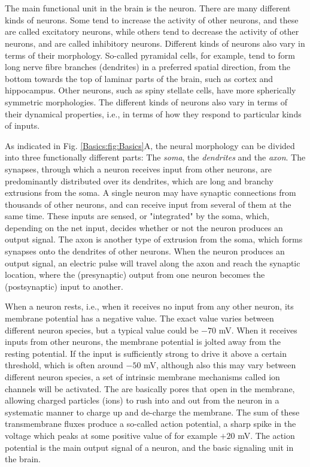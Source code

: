 \section{}
The main functional unit in the brain is the neuron. There are many different kinds of neurons. Some tend to increase the activity of other neurons, and these are called excitatory neurons, while others tend to decrease the activity of other neurons, and are called inhibitory neurons. Different kinds of neurons also vary in terms of their morphology. So-called pyramidal cells, for example, tend to form long nerve fibre branches (dendrites) in a preferred spatial direction, from the bottom towards the top of laminar parts of the brain, such as cortex and hippocampus. Other neurons, such as spiny stellate cells, have more spherically symmetric morphologies. The different kinds of neurons also vary in terms of their dynamical properties, i.e., in terms of how they respond to particular kinds of inputs.

As indicated in Fig. \ref{Basics:fig:Basics}A, the neural morphology can be divided into three functionally different parts: The \textit{soma}, the \textit{dendrites} and the \textit{axon}. The synapses, through which a neuron receives input from other neurons, are predominantly distributed over its dendrites, which are long and branchy extrusions from the soma. A single neuron may have synaptic connections from thousands of other neurons, and can receive input from several of them at the same time. These inputs are sensed, or "integrated" by the soma, which, depending on the net input, decides whether or not the neuron produces an output signal. The axon is another type of extrusion from the soma, which forms synapses onto the dendrites of other neurons. When the neuron produces an output signal, an electric pulse will travel along the axon and reach the synaptic location, where the (presynaptic) output from one neuron becomes the (postsynaptic) input to another.

When a neuron rests, i.e., when it receives no input from any other neuron, its membrane potential has a negative value. The exact value varies between different neuron species, but a typical value could be $-70$ mV. When it receives inputs from other neurons, the membrane potential is jolted away from the resting potential. If the input is sufficiently strong to drive it above a certain threshold, which is often around $-50$ mV, although also this may vary between different neuron species, a set of intrinsic membrane mechanisms called ion channels will be activated. The are basically pores that open in the membrane, allowing charged particles (ions) to rush into and out from the neuron in a systematic manner to charge up and de-charge the membrane.
The sum of these transmembrane fluxes produce a so-called action potential, a sharp spike in the voltage which peaks at some positive value of for example $+20$ mV. The action potential is the main output signal of a neuron, and the basic signaling unit in the brain.

